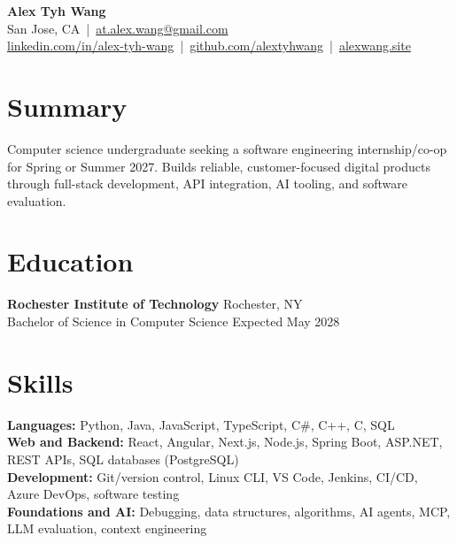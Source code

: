 \documentclass[10pt,letterpaper]{article}
\begin{document}
\begin{center}
{\Large \textbf{Alex Tyh Wang}}\\
San Jose, CA \,|\, \href{mailto:at.alex.wang@gmail.com}{at.alex.wang@gmail.com}\\
\small \href{https://www.linkedin.com/in/alex-tyh-wang/}{linkedin.com/in/alex-tyh-wang} \,|\, \href{https://github.com/alextyhwang}{github.com/alextyhwang} \,|\, \href{https://alexwang.site}{alexwang.site}
\end{center}

\section*{Summary}
Computer science undergraduate seeking a software engineering internship/co-op for Spring or Summer 2027. Builds reliable, customer-focused digital products through full-stack development, API integration, AI tooling, and software evaluation.

\section*{Education}
\textbf{Rochester Institute of Technology} \hfill Rochester, NY\\
Bachelor of Science in Computer Science \hfill Expected May 2028

\section*{Skills}
\textbf{Languages:} Python, Java, JavaScript, TypeScript, C\#, C++, C, SQL\\
\textbf{Web and Backend:} React, Angular, Next.js, Node.js, Spring Boot, ASP.NET, REST APIs, SQL databases (PostgreSQL)\\
\textbf{Development:} Git/version control, Linux CLI, VS Code, Jenkins, CI/CD, Azure DevOps, software testing\\
\textbf{Foundations and AI:} Debugging, data structures, algorithms, AI agents, MCP, LLM evaluation, context engineering
\end{document}

